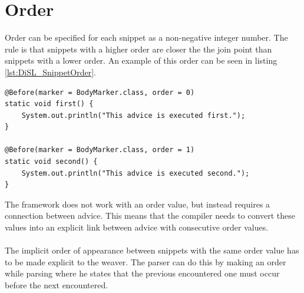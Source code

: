 \documentclass[a4paper]{report}
\begin{document}
\section{Order}
Order can be specified for each snippet as a non-negative integer number. The rule is that snippets with a higher order are closer the the join point than snippets with a lower order. An example of this order can be seen in listing \ref{lst:DiSL_SnippetOrder}.
\begin{lstlisting}[caption=Example of order between two snippets.,label=lst:DiSL_SnippetOrder]
@Before(marker = BodyMarker.class, order = 0)
static void first() {
	System.out.println("This advice is executed first.");
}

@Before(marker = BodyMarker.class, order = 1)
static void second() {
	System.out.println("This advice is executed second.");
}
\end{lstlisting}
The framework does not work with an order value, but instead requires a connection between advice. This means that the compiler needs to convert these values into an explicit link between advice with consecutive order values.\\
\\
The implicit order of appearance between snippets with the same order value has to be made explicit to the weaver. The parser can do this by making an order while parsing where he states that the previous encountered one must occur before the next encountered.
\end{document}
